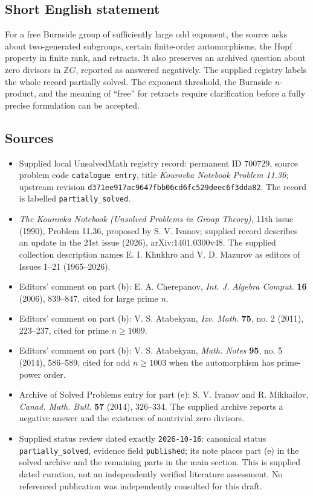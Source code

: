 \documentclass[11pt]{article}
\newcommand{\Z}{\mathbb{Z}}
\begin{document}
\subsection{Short English statement}
For a free Burnside group of sufficiently large odd exponent, the source asks about two-generated subgroups, certain finite-order automorphisms, the Hopf property in finite rank, and retracts. It also preserves an archived question about zero divisors in \(\Z G\), reported as answered negatively. The supplied registry labels the whole record partially solved. The exponent threshold, the Burnside \(n\)-product, and the meaning of ``free'' for retracts require clarification before a fully precise formulation can be accepted.
\subsection{Sources}
\begin{itemize}
\item Supplied local UnsolvedMath registry record: permanent ID \(700729\), source problem code \texttt{catalogue entry}, title \emph{Kourovka Notebook Problem 11.36}; upstream revision \texttt{d371ee917ac9647fbb06cd6fc529deec6f3dda82}. The record is labelled \texttt{partially\_solved}.
\item \emph{The Kourovka Notebook (Unsolved Problems in Group Theory)}, 11th issue (1990), Problem 11.36, proposed by S. V. Ivanov; supplied record describes an update in the 21st issue (2026), arXiv:1401.0300v48. The supplied collection description names E. I. Khukhro and V. D. Mazurov as editors of Issues 1--21 (1965--2026).
\item Editors' comment on part (b): E. A. Cherepanov, \emph{Int. J. Algebra Comput.} \textbf{16} (2006), 839--847, cited for large prime \(n\).
\item Editors' comment on part (b): V. S. Atabekyan, \emph{Izv. Math.} \textbf{75}, no. 2 (2011), 223--237, cited for prime \(n\ge1009\).
\item Editors' comment on part (b): V. S. Atabekyan, \emph{Math. Notes} \textbf{95}, no. 5 (2014), 586--589, cited for odd \(n\ge1003\) when the automorphism has prime-power order.
\item Archive of Solved Problems entry for part (e): S. V. Ivanov and R. Mikhailov, \emph{Canad. Math. Bull.} \textbf{57} (2014), 326--334. The supplied archive reports a negative answer and the existence of nontrivial zero divisors.
\item Supplied status review dated exactly \texttt{2026-10-16}: canonical status \texttt{partially\_solved}, evidence field \texttt{published}; its note places part (e) in the solved archive and the remaining parts in the main section. This is supplied dated curation, not an independently verified literature assessment. No referenced publication was independently consulted for this draft.
\end{itemize}
\end{document}
